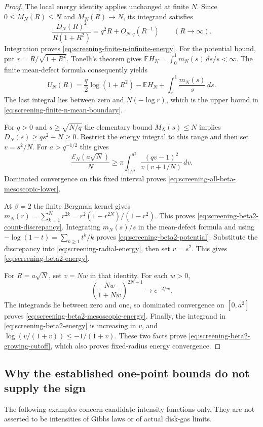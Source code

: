 \documentclass[11pt,a4paper]{article}
\numberwithin{equation}{section}
\theoremstyle{definition}
\theoremstyle{remark}
\begin{document}
\begin{proof}
The local energy identity applies unchanged at finite $N$.
Since $0\le M_N(R)\le N$ and $M_N(R)\to N$, its integrand
satisfies
\[
 \frac{D_N(R)^2}{R(1+R^2)}=q^2R+O_{N,q}(R^{-1})
       \qquad(R\to\infty).
\]
Integration proves \eqref{eq:screening-finite-n-infinite-energy}.
For the potential bound, put $r=R/\sqrt{1+R^2}$.  Tonelli's
theorem gives
$\mathbb EH_N=\int_0^1m_N(s)\,ds/s<\infty$.
The finite mean-defect formula consequently yields
\[
 U_N(R)=\frac q2\log(1+R^2)-\mathbb EH_N
                  +\int_r^1\frac{m_N(s)}s\,ds.
\]
 The last integral lies between zero and $N(-\log r)$, which is
the upper bound in \eqref{eq:screening-finite-n-mean-boundary}.

For $q>0$ and $s\ge\sqrt{N/q}$ the elementary bound
$M_N(s)\le N$ implies $D_N(s)\ge qs^2-N\ge0$.  Restrict
the energy integral to this range and then set $v=s^2/N$.
For $a>q^{-1/2}$ this gives
\[
 \frac{\mathcal E_N(a\sqrt N)}N
 \ge\pi\int_{1/q}^{a^2}
        \frac{(qv-1)^2}{v(v+1/N)}\,dv.
\]
Dominated convergence on this fixed interval proves
\eqref{eq:screening-all-beta-mesoscopic-lower}.

At $\beta=2$ the finite Bergman kernel gives
$m_N(r)=\sum_{k=1}^Nr^{2k}=r^2(1-r^{2N})/(1-r^2)$.
This proves \eqref{eq:screening-beta2-count-discrepancy}.
Integrating $m_N(s)/s$ in the mean-defect formula and using
$-\log(1-t)=\sum_{k\ge1}t^k/k$ proves
\eqref{eq:screening-beta2-potential}.  Substitute the discrepancy
into \eqref{eq:screening-radial-energy}, then set $v=s^2$.
This gives \eqref{eq:screening-beta2-energy}.

For $R=a\sqrt N$, set $v=Nw$ in that identity.  For each $w>0$,
\[
 \left(\frac{Nw}{1+Nw}\right)^{2N+1}\longrightarrow e^{-2/w}.
\]
The integrands lie between zero and one, so dominated convergence
on $[0,a^2]$ proves \eqref{eq:screening-beta2-mesoscopic-energy}.
Finally, the integrand in \eqref{eq:screening-beta2-energy} is
increasing in $v$, and
$\log(v/(1+v))\le-1/(1+v)$.  These two facts prove
\eqref{eq:screening-beta2-growing-cutoff}, which also proves
fixed-radius energy convergence.
\end{proof}

\subsection{Why the established one-point bounds do not supply the sign}
\label{subsec:screening-one-point-obstruction}

The following examples concern candidate intensity functions only.
They are not asserted to be intensities of Gibbs laws or of actual
disk-gas limits.
\end{document}
